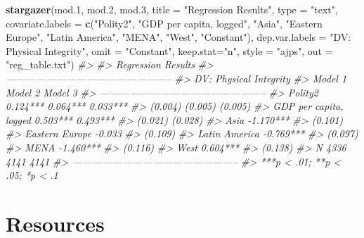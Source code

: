 \documentclass[]{book}
\newenvironment{Shaded}{\begin{snugshade}}{\end{snugshade}}
\newcommand{\CommentTok}[1]{\textcolor[rgb]{0.56,0.35,0.01}{\textit{#1}}}
\newcommand{\DataTypeTok}[1]{\textcolor[rgb]{0.13,0.29,0.53}{#1}}
\newcommand{\FloatTok}[1]{\textcolor[rgb]{0.00,0.00,0.81}{#1}}
\newcommand{\KeywordTok}[1]{\textcolor[rgb]{0.13,0.29,0.53}{\textbf{#1}}}
\newcommand{\NormalTok}[1]{#1}
\newcommand{\StringTok}[1]{\textcolor[rgb]{0.31,0.60,0.02}{#1}}
\begin{document}
\begin{Shaded}
\begin{Highlighting}[]
\KeywordTok{stargazer}\NormalTok{(mod}\FloatTok{.1}\NormalTok{, mod}\FloatTok{.2}\NormalTok{, mod}\FloatTok{.3}\NormalTok{, }\DataTypeTok{title =} \StringTok{"Regression Results"}\NormalTok{, }\DataTypeTok{type =} \StringTok{"text"}\NormalTok{, }
          \DataTypeTok{covariate.labels  =} \KeywordTok{c}\NormalTok{(}\StringTok{"Polity2"}\NormalTok{, }\StringTok{"GDP per capita, logged"}\NormalTok{, }\StringTok{"Asia"}\NormalTok{, }\StringTok{"Eastern Europe"}\NormalTok{, }\StringTok{"Latin America"}\NormalTok{, }\StringTok{"MENA"}\NormalTok{, }\StringTok{"West"}\NormalTok{, }\StringTok{"Constant"}\NormalTok{), }
          \DataTypeTok{dep.var.labels =} \StringTok{"DV: Physical Integrity"}\NormalTok{,}
          \DataTypeTok{omit =} \StringTok{"Constant"}\NormalTok{, }
          \DataTypeTok{keep.stat=}\StringTok{"n"}\NormalTok{, }\DataTypeTok{style =} \StringTok{"ajps"}\NormalTok{,}
          \DataTypeTok{out =} \StringTok{"reg_table.txt"}\NormalTok{)}
\CommentTok{#> }
\CommentTok{#> Regression Results}
\CommentTok{#> --------------------------------------------------}
\CommentTok{#>                          DV: Physical Integrity   }
\CommentTok{#>                        Model 1  Model 2   Model 3 }
\CommentTok{#> --------------------------------------------------}
\CommentTok{#> Polity2                0.124*** 0.064*** 0.033*** }
\CommentTok{#>                        (0.004)  (0.005)   (0.005) }
\CommentTok{#> GDP per capita, logged          0.503*** 0.493*** }
\CommentTok{#>                                 (0.021)   (0.028) }
\CommentTok{#> Asia                                     -1.170***}
\CommentTok{#>                                           (0.101) }
\CommentTok{#> Eastern Europe                            -0.033  }
\CommentTok{#>                                           (0.109) }
\CommentTok{#> Latin America                            -0.769***}
\CommentTok{#>                                           (0.097) }
\CommentTok{#> MENA                                     -1.460***}
\CommentTok{#>                                           (0.116) }
\CommentTok{#> West                                     0.604*** }
\CommentTok{#>                                           (0.138) }
\CommentTok{#> N                        4336     4141     4141   }
\CommentTok{#> --------------------------------------------------}
\CommentTok{#> ***p < .01; **p < .05; *p < .1}
\end{Highlighting}
\end{Shaded}

\hypertarget{part-resources}{%
\part{Resources}\label{part-resources}}
\end{document}

